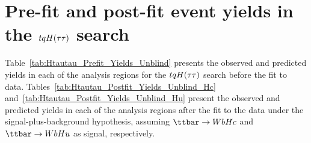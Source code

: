 \section{Pre-fit and post-fit event yields in the $tqH(\tau\tau)$ search}
\label{sec:prepostfit_yields_Htautau_appendix}

Table~\ref{tab:Htautau_Prefit_Yields_Unblind} presents the observed and predicted yields in each of the analysis regions 
for the $tqH(\tau\tau)$ search before the fit to data. 
Tables~\ref{tab:Htautau_Postfit_Yields_Unblind_Hc} and~\ref{tab:Htautau_Postfit_Yields_Unblind_Hu} present the observed and predicted yields 
in each of the analysis regions after the fit to the data under the signal-plus-background hypothesis, assuming 
$\Hc$ and $\Hu$ as signal, respectively.


